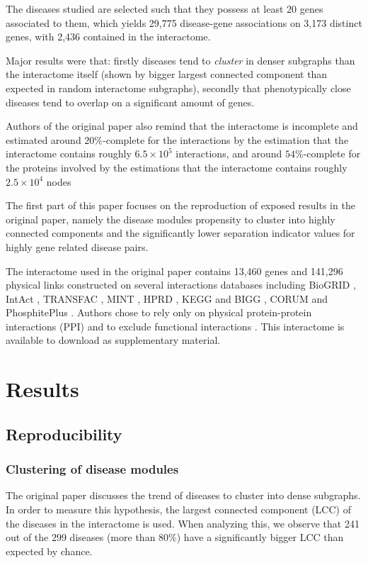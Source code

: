 \documentclass[letterpaper]{article}
\begin{document}
The diseases studied are selected such that they possess at least 20 genes associated to them, which yields
29,775 disease-gene associations on 3,173 distinct genes, with 2,436 contained in the interactome.

Major results were that: firstly diseases tend to \textit{cluster} in denser subgraphs than the
interactome itself (shown by bigger largest connected component than expected in random interactome
subgraphs), secondly that phenotypically close diseases tend to overlap on a significant amount of genes.

Authors of the original paper also remind that the interactome is incomplete and estimated around $20\%$-complete
for the interactions by the estimation that the interactome contains roughly $6.5 \times 10^5$ interactions,
and around $54\%$-complete for the proteins involved by the estimations that the interactome contains roughly
$2.5 \times 10^4$ nodes \citep{ATruerMeasureOfOurIgnorance,estimatingTheSizeOfTheHumanInteractome}

The first part of this paper focuses on the reproduction of exposed results in the original paper,
namely the disease modules propensity to cluster into highly connected components and the significantly
lower separation indicator values for highly gene related disease pairs.

The interactome used in the original paper contains 13,460 genes and 141,296 physical links constructed on several
interactions databases including BioGRID \citep{chatr2017biogrid}, IntAct \citep{kerrien2011intact},
TRANSFAC \citep{matys2003transfac}, MINT \citep{licata2011mint}, HPRD \citep{keshava2008HPRD}, KEGG and
BIGG \citep{lee2008KEGG-BIGG}, CORUM \citep{ruepp2009corum} and PhosphitePlus \citep{hornbeck2011phosphositeplus}.
Authors chose to rely only on physical protein-protein interactions (PPI) and to exclude functional interactions
\citep{caldera2017interactome}. This interactome is available to download as supplementary material.

\section{Results}
	\subsection{Reproducibility}
		\subsubsection{Clustering of disease modules}\label{subsec:clustering of disease modules}
		The original paper discusses the trend of diseases to cluster into dense subgraphs. In order to measure
		this hypothesis, the largest connected component (LCC) of the diseases in the interactome is used.
		When analyzing this, we observe that 241 out of the 299 diseases (more than $80\%$) have a significantly
		bigger LCC than expected by chance.
\end{document}
